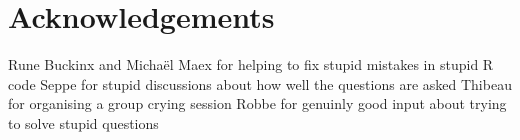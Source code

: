 \documentclass[a4paper]{article}
\begin{document}
\section*{Acknowledgements}
Rune Buckinx and Michaël Maex for helping to fix stupid mistakes in stupid R code
Seppe for stupid discussions about how well the questions are asked
Thibeau for organising a group crying session
Robbe for genuinly good input about trying to solve stupid questions

\printbibliography

\end{document}
